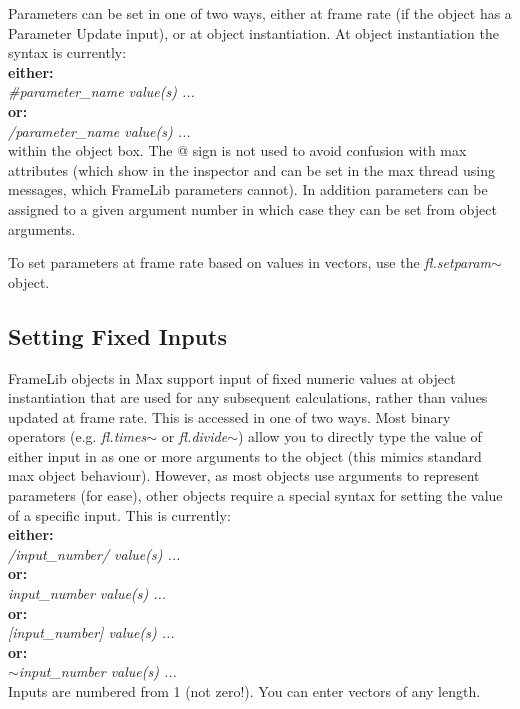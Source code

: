 \documentclass{article}
\newcommand{\flobject}[1]{\textit{fl.#1$\sim$}}
\begin{document}
Parameters can be set in one of two ways, either at frame rate (if the object has a Parameter Update input), or at object instantiation. At object instantiation the syntax is currently: \\ \textbf{either:}\\ 
\-\hspace{4ex} \textit{\#parameter\_name value(s) ...} \\ 
\textbf{or:}\\ 
\-\hspace{4ex} \textit{/parameter\_name value(s) ...} \\ 
within the object box. The @ sign is not used to avoid confusion with max attributes (which show in the inspector and can be set in the max thread using messages, which FrameLib parameters cannot). In addition parameters can be assigned to a given argument number in which case they can be set from object arguments.

To set parameters at frame rate based on values in vectors, use the \flobject{setparam} object.

\subsection{Setting Fixed Inputs}

FrameLib objects in Max support input of fixed numeric values at object instantiation that are used for any subsequent calculations, rather than values updated at frame rate. This is accessed in one of two ways. Most binary operators (e.g. \flobject{times} or \flobject{divide}) allow you to directly type the value of either input in as one or more arguments to the object (this mimics standard max object behaviour). However, as most objects use arguments to represent parameters (for ease), other objects require a special syntax for setting the value of a specific input. This is currently:\\
\textbf{either:}\\ 
\-\hspace{4ex} \textit{/input\_number/ value(s) ...} \\ 
\textbf{or:}\\ 
\-\hspace{4ex} \textit{\textlangle input\_number\textrangle{} value(s) ...} \\ 
\textbf{or:}\\ 
\-\hspace{4ex} \textit{[input\_number] value(s) ...} \\ 
\textbf{or:}\\ 
\-\hspace{4ex} \textit{$\sim$input\_number value(s) ...} \\ 
Inputs are numbered from 1 (not zero!). You can enter vectors of any length.
\end{document}
